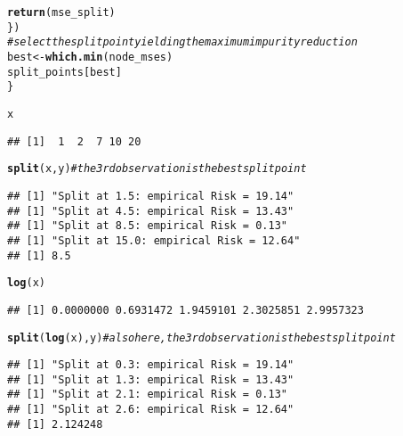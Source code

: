 \documentclass[a4paper]{article}
\makeatletter
\newcommand{\hlcom}[1]{\textcolor[rgb]{0.678,0.584,0.686}{\textit{#1}}}%
\newcommand{\hlstd}[1]{\textcolor[rgb]{0.345,0.345,0.345}{#1}}%
\newcommand{\hlkwb}[1]{\textcolor[rgb]{0.69,0.353,0.396}{#1}}%
\newcommand{\hlkwd}[1]{\textcolor[rgb]{0.737,0.353,0.396}{\textbf{#1}}}%
\newenvironment{kframe}{%
 \def\at@end@of@kframe{}%
 \ifinner\ifhmode%
  \def\at@end@of@kframe{\end{minipage}}%
  \begin{minipage}{\columnwidth}%
 \fi\fi%
 \def\FrameCommand##1{\hskip\@totalleftmargin \hskip-\fboxsep
 \colorbox{shadecolor}{##1}\hskip-\fboxsep
     \hskip-\linewidth \hskip-\@totalleftmargin \hskip\columnwidth}%
 \MakeFramed {\advance\hsize-\width
   \@totalleftmargin\z@ \linewidth\hsize
   \@setminipage}}%
 {\par\unskip\endMakeFramed%
 \at@end@of@kframe}
\newenvironment{knitrout}{}{} %
\makeatother
\begin{document}
{\begin{itemize}
\begin{knitrout}
\begin{kframe}
\begin{alltt}
    \hlkwd{return}\hlstd{(mse_split)}
  \hlstd{\})}
  \hlcom{# select the split point yielding the maximum impurity reduction}
  \hlstd{best} \hlkwb{<-} \hlkwd{which.min}\hlstd{(node_mses)}
  \hlstd{split_points[best]}
\hlstd{\}}

\hlstd{x}
\end{alltt}
\begin{verbatim}
## [1]  1  2  7 10 20
\end{verbatim}
\begin{alltt}
\hlkwd{split}\hlstd{(x, y)} \hlcom{# the 3rd observation is the best split point}
\end{alltt}
\begin{verbatim}
## [1] "Split at 1.5: empirical Risk = 19.14"
## [1] "Split at 4.5: empirical Risk = 13.43"
## [1] "Split at 8.5: empirical Risk = 0.13"
## [1] "Split at 15.0: empirical Risk = 12.64"
## [1] 8.5
\end{verbatim}
\begin{alltt}
\hlkwd{log}\hlstd{(x)}
\end{alltt}
\begin{verbatim}
## [1] 0.0000000 0.6931472 1.9459101 2.3025851 2.9957323
\end{verbatim}
\begin{alltt}
\hlkwd{split}\hlstd{(}\hlkwd{log}\hlstd{(x), y)} \hlcom{# also here, the 3rd observation is the best split point}
\end{alltt}
\begin{verbatim}
## [1] "Split at 0.3: empirical Risk = 19.14"
## [1] "Split at 1.3: empirical Risk = 13.43"
## [1] "Split at 2.1: empirical Risk = 0.13"
## [1] "Split at 2.6: empirical Risk = 12.64"
## [1] 2.124248
\end{verbatim}
\end{kframe}
\end{knitrout}


\end{itemize}
}

\dlz

\pagebreak
\end{document}
